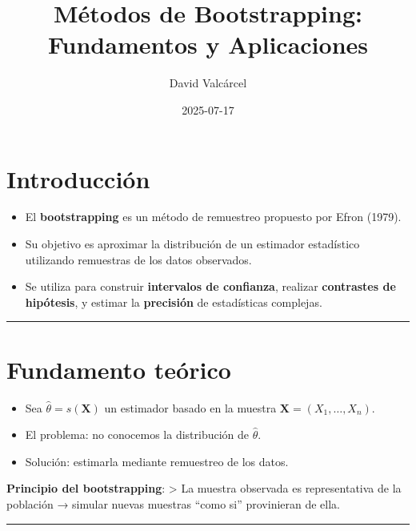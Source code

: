 \documentclass[
  spanish,
  11pt,
]{article}
\title{Métodos de Bootstrapping: Fundamentos y Aplicaciones}
\author{David Valcárcel}
\date{2025-07-17}
\providecommand{\tightlist}{%
  \setlength{\itemsep}{0pt}\setlength{\parskip}{0pt}}
\renewcommand*\contentsname{Tabla de contenidos}
\newcommand\contentsname{Tabla de contenidos}
\begin{document}
\maketitle

\renewcommand*\contentsname{Tabla de contenidos}
{
\hypersetup{linkcolor=}
\setcounter{tocdepth}{3}
\tableofcontents
}

\section{Introducción}\label{introducciuxf3n}

\begin{itemize}
\tightlist
\item
  El \textbf{bootstrapping} es un método de remuestreo propuesto por
  Efron (1979).
\item
  Su objetivo es aproximar la distribución de un estimador estadístico
  utilizando remuestras de los datos observados.
\item
  Se utiliza para construir \textbf{intervalos de confianza}, realizar
  \textbf{contrastes de hipótesis}, y estimar la \textbf{precisión} de
  estadísticas complejas.
\end{itemize}

\begin{center}\rule{0.5\linewidth}{0.5pt}\end{center}

\section{Fundamento teórico}\label{fundamento-teuxf3rico}

\begin{itemize}
\tightlist
\item
  Sea \(\hat{\theta} = s(\mathbf{X})\) un estimador basado en la muestra
  \(\mathbf{X} = (X_1, \dots, X_n)\).
\item
  El problema: no conocemos la distribución de \(\hat{\theta}\).
\item
  Solución: estimarla mediante remuestreo de los datos.
\end{itemize}

\textbf{Principio del bootstrapping}: \textgreater{} La muestra
observada es representativa de la población → simular nuevas muestras
``como si'' provinieran de ella.

\begin{center}\rule{0.5\linewidth}{0.5pt}\end{center}
\end{document}
